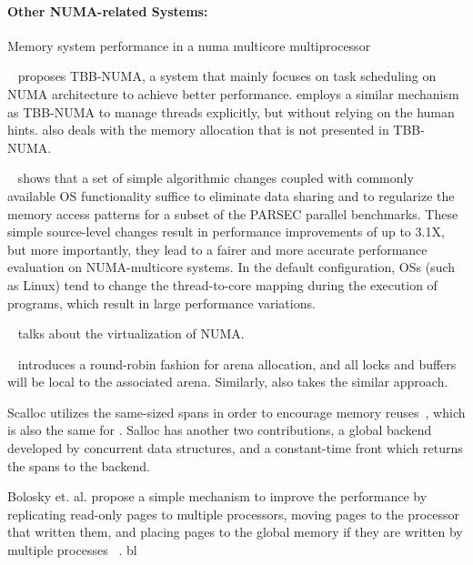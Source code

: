 \paragraph{Other NUMA-related Systems:} 

Memory system performance in a numa multicore multiprocessor

~\cite{Majo:2015:LPC:2688500.2688509} proposes TBB-NUMA, a system that mainly focuses on task scheduling on NUMA architecture to achieve better performance. \NM{} employs a similar mechanism as TBB-NUMA to manage threads explicitly, but without relying on the human hints. \NM{} also deals with the memory allocation that is not presented in TBB-NUMA. 

~\cite{6704666} shows that a set of simple algorithmic changes coupled with commonly available OS functionality suffice to eliminate data sharing and to regularize the memory access patterns for a subset of the PARSEC parallel benchmarks. These simple source-level changes result in performance improvements of up to 3.1X, but more importantly, they lead to a fairer and more accurate performance evaluation on NUMA-multicore systems. In the default
configuration, OSs (such as Linux) tend to change the thread-to-core mapping during the execution of programs, which result in large performance variations.

~\cite{Bui:2019:EPV:3302424.3303960} talks about the virtualization of NUMA.

~\cite{jemalloc} introduces a round-robin fashion for arena allocation, and all locks and buffers will be local to the associated arena. Similarly, \NM{} also takes the similar approach. 

Scalloc utilizes the same-sized spans in order to encourage memory reuses~\cite{Scalloc}, which is also the same for \NM{}. Salloc has another two contributions, a global backend developed by concurrent data structures, and a constant-time front which returns the spans to the backend. 

Bolosky et. al. propose a simple mechanism to improve the performance by replicating read-only pages to multiple processors, moving pages to the processor that written them, and placing pages to the global memory if they are written by multiple processes ~\cite{Bolosky:1989:SBE:74850.74854}. bl
